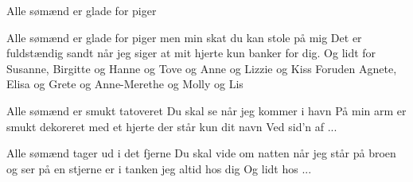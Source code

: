 \begin{sang}{Alle sømænd er glade for piger}{}
\begin{vers}
Alle sømænd er glade for piger
men min skat du kan stole på mig
Det er fuldstændig sandt når jeg siger
at mit hjerte kun banker for dig.
Og lidt for Susanne, Birgitte og Hanne
og Tove og Anne og Lizzie og Kiss
Foruden Agnete, Elisa og Grete
og Anne-Merethe og Molly og Lis
\end{vers}
\begin{vers}
Alle sømænd er smukt tatoveret
Du skal se når jeg kommer i havn
På min arm er smukt dekoreret
med et hjerte der står kun dit navn
Ved sid'n af ...
\end{vers}
\begin{vers}
Alle sømænd tager ud i det fjerne
Du skal vide om natten når jeg
står på broen og ser på en stjerne
er i tanken jeg altid hos dig
Og lidt hos ...
\end{vers}
\laps
\end{sang}